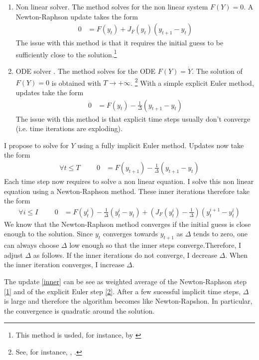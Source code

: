 \documentclass[english]{article}
\begin{document}
	\begin{enumerate}
		\item Non linear solver. The method solves for the non linear system $F (Y ) = 0$. A Newton-Raphson update takes the form
		\begin{align}\label{1}
			0 &= F(y_{t}) + J_{F}(y_t) (y_{t+1} - y_t)
		\end{align}
		The issue with this method is that it requires the initial guess to be sufficiently close to the solution.\footnote{This method is usded, for instance, by \citet{garleanu2015young}}
		\item ODE solver . The method solves for the ODE $F(Y) = \dot{Y}$. The solution of $F(Y)=0$ is obtained with $T\rightarrow +\infty$. \footnote{See, for instance, \citet{ditellabalance}, \citet{silva2015risk}.}
		With a simple explicit Euler method, updates take the form
		\begin{align}\label{2}
			0&= F(y_t) - \frac{1}{\Delta} (y_{t+1} -y_{t})
		\end{align}
		The issue with this method is that explicit time steps usually don't converge (i.e. time iterations are exploding).
	\end{enumerate}
	I propose to solve for $Y$ using a fully implicit Euler method.  Updates now take the form 
	\begin{align*}
		\forall t \leq T \hspace{1cm} 0&= F(y_{t+1}) - \frac{1}{\Delta}(y_{t+1} -y_{t})
	\end{align*}
	Each time step now requires to solve a non linear equation. I solve this non linear equation using a Newton-Raphson method. These inner iterations therefore take the form
	\begin{align}\label{inner}
		\forall i \leq I \hspace{1cm}	0 &= F(y_{t}^i) - \frac{1}{\Delta}(y_{t}^{i} -y_{t}) + (J_{F}(y_t^i) -  \frac{1}{\Delta})(y^{i+1}_{t} - y_t^i)
	\end{align}
	We know that the Newton-Raphson method converges if the initial guess is close enough to the solution. Since $y_{t}$ converges towards $y_{t+1}$ as $\Delta$ tends to zero, one can always choose $\Delta$ low enough so that the inner steps converge.Therefore, I adjust $\Delta$ as follows. If the inner iterations do not converge, I decrease $\Delta$. When the inner iteration converges, I increase $\Delta$. \par
	The update \cref{inner} can be see as weighted average of the Newton-Raphson step \cref{1} and of the explicit Euler step \cref{2}.  After a few sucessful implicit time steps, $\Delta$ is large and therefore the algorithm becomes like Newton-Rapshon. In particular, the convergence is quadratic around the solution. \par
\end{document}
